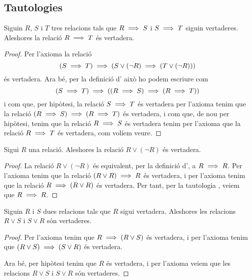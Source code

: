 \documentclass[../../Main.tex]{subfiles}
\begin{document}
	\subsection{Tautologies}
	\begin{tautology}
		\label{taut:transitivitat implicacions}
		Siguin \(R\), \(S\) i \(T\) tres relacions tals que \(R\implies S\) i \(S\implies T\) siguin vertaderes. Aleshores la relació \(R\implies T\) és vertadera.
		\begin{proof}
			Per l'axioma  la relació
			\[(S\implies T)\implies(S\lor(\lnot R)\implies(T\lor(\lnot R)))\]
			és vertadera. Ara bé, per la definició d' això ho podem escriure com
			\[(S\implies T)\implies((R\implies S)\implies(R\implies T))\]
			i com que, per hipòtesi, la relació \(S\implies T\) és vertadera per l'axioma  tenim que la relació \((R\implies S)\implies(R\implies T)\) és vertadera, i com que, de nou per hipòtesi, tenim que la relació \(R\implies S\) és vertadera tenim per l'axioma  que la relació \(R\implies T\) és vertadera, com volíem veure.
		\end{proof}
	\end{tautology}
	\begin{tautology}
		\label{taut:R o no R és vertadera}\label{taut:tercer exclòs}
		Sigui \(R\) una relació. Aleshores la relació \(R\lor(\lnot R)\) és vertadera.
		\begin{proof}
			La relació \(R\lor(\lnot R)\) és equivalent, per la definició d', a \(R\implies R\). Per l'axioma  tenim que la relació \((R\lor R)\implies R\) és vertadera, i per l'axioma  tenim que la relació \(R\implies(R\lor R)\) és vertadera. Per tant, per la tautologia , veiem que \(R\implies R\).
		\end{proof}
	\end{tautology}
	\begin{tautology}
		\label{taut:disjunció és vertadera si una de les relaciones és vertadera}
		Siguin \(R\) i \(S\) dues relacions tals que \(R\) sigui vertadera. Aleshores les relacions \(R\lor S\) i \(S\lor R\) són vertaderes.
		\begin{proof}
			Per l'axioma  tenim que \(R\implies(R\lor S)\) és vertadera, i per l'axioma  tenim que \((R\lor S)\implies(S\lor R)\) és vertadera.
			
			Ara bé, per hipòtesi tenim que \(R\) és vertadera, i per l'axioma  veiem que les relacions \(R\lor S\) i \(S\lor R\) són vertaderes.
		\end{proof}
	\end{tautology}
\end{document}
